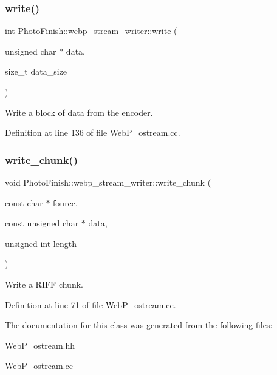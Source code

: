 \mbox{\label{class_photo_finish_1_1webp__stream__writer_af78944a649643669197131eb73241cf1}} 
\subsubsection{\texorpdfstring{write()}{write()}}
{\footnotesize\ttfamily int Photo\+Finish\+::webp\+\_\+stream\+\_\+writer\+::write (\begin{DoxyParamCaption}\item[{unsigned char $\ast$}]{data,  }\item[{size\+\_\+t}]{data\+\_\+size }\end{DoxyParamCaption})}



Write a block of data from the encoder. 



Definition at line 136 of file Web\+P\+\_\+ostream.\+cc.

\mbox{\label{class_photo_finish_1_1webp__stream__writer_ac5303bc270a92455915601648814d087}} 
\subsubsection{\texorpdfstring{write\+\_\+chunk()}{write\_chunk()}}
{\footnotesize\ttfamily void Photo\+Finish\+::webp\+\_\+stream\+\_\+writer\+::write\+\_\+chunk (\begin{DoxyParamCaption}\item[{const char $\ast$}]{fourcc,  }\item[{const unsigned char $\ast$}]{data,  }\item[{unsigned int}]{length }\end{DoxyParamCaption})}



Write a R\+I\+FF chunk. 



Definition at line 71 of file Web\+P\+\_\+ostream.\+cc.



The documentation for this class was generated from the following files\+:\begin{DoxyCompactItemize}
\item 
\hyperlink{_web_p__ostream_8hh}{Web\+P\+\_\+ostream.\+hh}\item 
\hyperlink{_web_p__ostream_8cc}{Web\+P\+\_\+ostream.\+cc}\end{DoxyCompactItemize}
